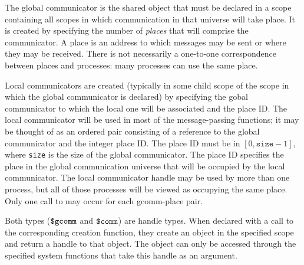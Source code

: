 The global communicator is the shared object that must be declared in
a scope containing all scopes in which communication in that universe
will take place. It is created by specifying the number of
\emph{places} that will comprise the communicator. A place is an
address to which messages may be sent or where they may be received.
There is not necessarily a one-to-one correspondence between places and
processes: many processes can use the same place.

Local communicators are created (typically in some child scope of the
scope in which the global communicator is declared) by specifying the
gobal communicator to which the local one will be associated and the
place ID. The local communicator will be used in most of the
message-passing functions; it may be thought of as an ordered pair
consisting of a reference to the global communicator and the integer
place ID.  The place ID must be in $[0,\texttt{size}-1]$, where
\texttt{size} is the size of the global communicator.  The place ID
specifies the place in the global communication universe that will be
occupied by the local communicator.  The local communicator handle may
be used by more than one process, but all of those processes will be
viewed as occupying the same place.  Only one call to \ccommcreate{}
may occur for each gcomm-place pair.


Both types ($\mbox{\texttt{\${}gcomm}}$ and $\mbox{\texttt{\${}comm}}$) are handle types. When declared
with a call to the corresponding creation function, they create an
object in the specified scope and return a handle to that object. The
object can only be accessed through the specified system functions
that take this handle as an argument.


